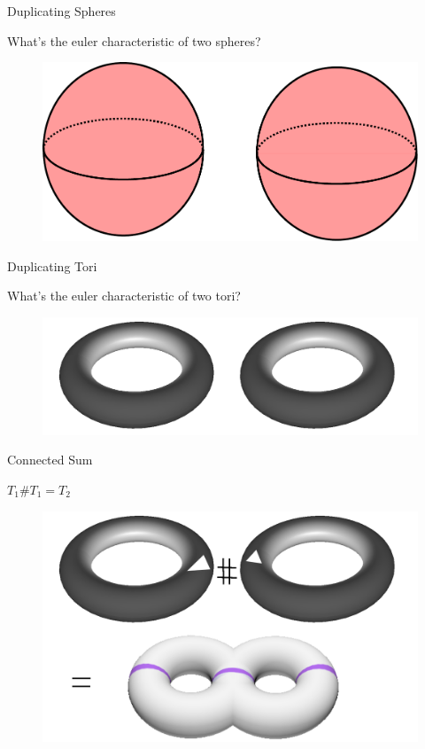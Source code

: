 \documentclass{beamer}
\begin{document}
\begin{frame}{Duplicating Spheres}

What's the euler characteristic of two spheres?

\begin{figure}[t]
    \includegraphics[width=\textwidth]{2Spheres.pdf}
\end{figure}


\end{frame}


\begin{frame}{Duplicating Tori}

What's the euler characteristic of two tori?

\begin{figure}[t]
    \includegraphics[width=\textwidth]{2Tori.png}
\end{figure}

\end{frame}

\begin{frame}{Connected Sum}

$T_1 \# T_1 = T_2$

\begin{figure}[t]
    \includegraphics[width=\textwidth]{ConnectedSum.png}
\end{figure}

\end{frame}
\end{document}
